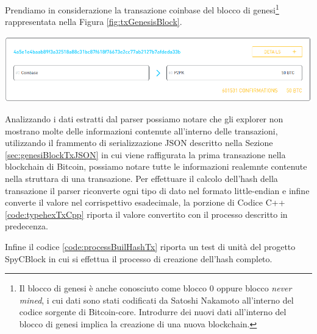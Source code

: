 \begin{example}

Prendiamo in considerazione la transazione coinbase del blocco di genesi\footnote{Il blocco di genesi è anche conosciuto come blocco 0 oppure blocco \emph{never mined}, i cui dati sono stati codificati da Satoshi Nakamoto all'interno del codice sorgente di Bitcoin-core. Introdurre dei nuovi dati all'interno del blocco di genesi implica la creazione di una nuova blockchain.} rappresentata nella Figura \ref{fig:txGenesisBlock}.

{\centering
\vspace{15pt}
\includegraphics[scale=0.35]{images/coinbase_tx_genesis_block.png}
\vspace{10pt}
\par}

Analizzando i dati estratti dal parser possiamo notare che gli explorer non mostrano molte delle informazioni contenute all'interno delle transazioni, utilizzando il frammento di serializzazione JSON descritto nella Sezione \ref{sec:genesiBlockTxJSON} in cui viene raffigurata la prima transazione nella blockchain di Bitcoin, possiamo notare tutte le informazioni realemnte contenute nella struttara di una transazione.
Per effettuare il calcolo dell'hash della transazione il parser riconverte ogni tipo di dato nel formato little-endian e infine converte il valore nel corrispettivo esadecimale, la porzione di Codice C++ \ref{code:typehexTxCpp} riporta il valore convertito con il processo descritto in predecenza.



Infine il codice \ref{code:processBuilHashTx} riporta un test di unità del progetto SpyCBlock in cui si effettua il processo di creazione dell'hash completo.



\end{example}
